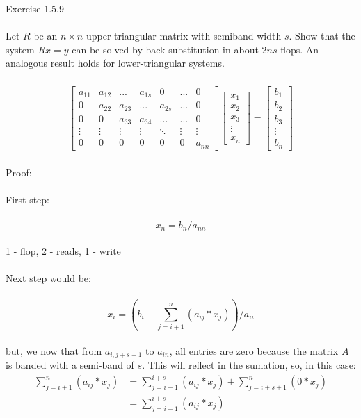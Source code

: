 \documentclass{article}
\begin{document}
	Exercise 1.5.9\\
	\\
	Let $R$ be an $n \times n$ upper-triangular matrix with semiband width $s$. Show that the system $Rx = y$ can be solved by back substitution in about $2ns$ flops. An analogous result holds for lower-triangular systems.\\
	\\
	\begin{align*}
	\begin{bmatrix}
	a_{11} & a_{12} & ...    & a_{1s} & 0      & ...    & 0\\
	0      & a_{22} & a_{23} & ...    & a_{2s} & ...    & 0\\
	0      & 0      & a_{33} & a_{34} & ...    & ...    & 0\\
	\vdots & \vdots & \vdots & \vdots & \ddots & \vdots & \vdots\\
	0      & 0      & 0      & 0      & 0      & 0      & a_{nn}
	\end{bmatrix} \begin{bmatrix}
	x_1\\x_2\\x_3\\ \vdots \\ x_n
	\end{bmatrix} = \begin{bmatrix}
	b_1\\b_2\\b_3\\ \vdots \\ b_n
	\end{bmatrix}
	\end{align*}
	\\
	Proof:\\
	\\
	First step:\\
	\\
	$$x_n =  b_n / a_{nn}$$
	\\
	1 - flop, 2 - reads, 1 - write\\
	\\
	Next step would be:\\
	\\	
	$$x_{i} = (b_i - \sum_{j=i+1}^{n}(a_{ij}*x_{j})) / a_{ii}$$
	\\
	but, we now that from $a_{i,j+s+1}$ to $a_{in}$, all entries are zero because the matrix $A$ is banded with a semi-band of $s$. This will reflect in the sumation, so, in this case:
	\begin{align*}
		\sum_{j=i+1}^{n}(a_{ij}*x_{j}) &= \sum_{j=i+1}^{i+s}(a_{ij}*x_{j}) + \sum_{j=i+s+1}^{n}(0*x_{j})\\
		&= \sum_{j=i+1}^{i+s}(a_{ij}*x_{j})\\
	\end{align*}
\end{document}
